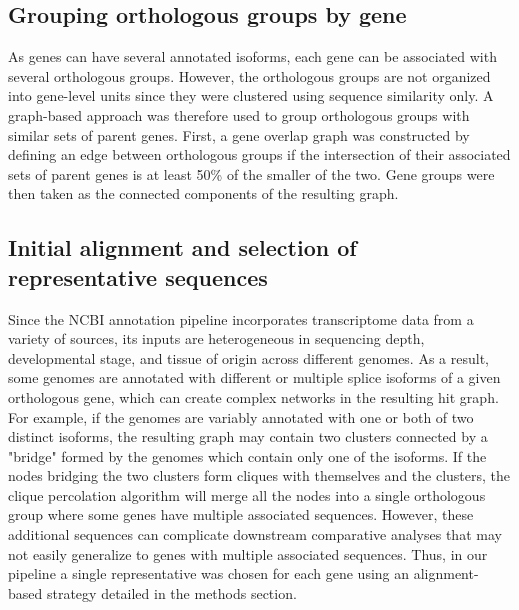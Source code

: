 \documentclass[10pt,letterpaper]{article}
\begin{document}
\subsection*{Grouping orthologous groups by gene}
As genes can have several annotated isoforms, each gene can be associated with several orthologous groups. However, the orthologous groups are not organized into gene-level units since they were clustered using sequence similarity only. A graph-based approach was therefore used to group orthologous groups with similar sets of parent genes. First, a gene overlap graph was constructed by defining an edge between orthologous groups if the intersection of their associated sets of parent genes is at least 50\% of the smaller of the two. Gene groups were then taken as the connected components of the resulting graph.

\subsection*{Initial alignment and selection of representative sequences}
Since the NCBI annotation pipeline incorporates transcriptome data from a variety of sources, its inputs are heterogeneous in sequencing depth, developmental stage, and tissue of origin across different genomes. As a result, some genomes are annotated with different or multiple splice isoforms of a given orthologous gene, which can create complex networks in the resulting hit graph. For example, if the genomes are variably annotated with one or both of two distinct isoforms, the resulting graph may contain two clusters connected by a "bridge" formed by the genomes which contain only one of the isoforms. If the nodes bridging the two clusters form cliques with themselves and the clusters, the clique percolation algorithm will merge all the nodes into a single orthologous group where some genes have multiple associated sequences. However, these additional sequences can complicate downstream comparative analyses that may not easily generalize to genes with multiple associated sequences. Thus, in our pipeline a single representative was chosen for each gene using an alignment-based strategy detailed in the methods section.
\end{document}
